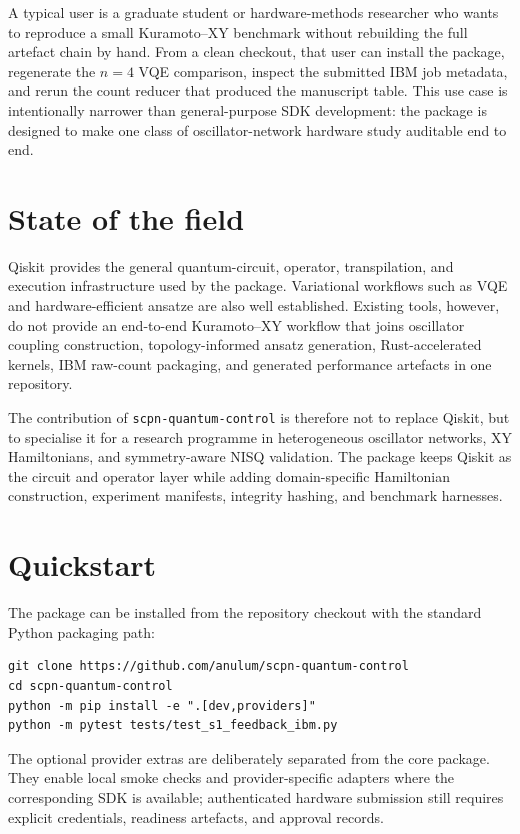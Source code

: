 \documentclass[11pt]{article}
\begin{document}
A typical user is a graduate student or hardware-methods researcher who wants
to reproduce a small Kuramoto--XY benchmark without rebuilding the full
artefact chain by hand. From a clean checkout, that user can install the
package, regenerate the $n=4$ VQE comparison, inspect the submitted IBM job
metadata, and rerun the count reducer that produced the manuscript table. This
use case is intentionally narrower than general-purpose SDK development: the
package is designed to make one class of oscillator-network hardware study
auditable end to end.

\section*{State of the field}

Qiskit provides the general quantum-circuit, operator, transpilation, and
execution infrastructure used by the package. Variational workflows such as VQE
and hardware-efficient ansatze are also well established. Existing tools,
however, do not provide an end-to-end Kuramoto--XY workflow that joins
oscillator coupling construction, topology-informed ansatz generation,
Rust-accelerated kernels, IBM raw-count packaging, and generated performance
artefacts in one repository.

The contribution of \texttt{scpn-quantum-control} is therefore not to replace
Qiskit, but to specialise it for a research programme in heterogeneous
oscillator networks, XY Hamiltonians, and symmetry-aware NISQ validation. The
package keeps Qiskit as the circuit and operator layer while adding
domain-specific Hamiltonian construction, experiment manifests, integrity
hashing, and benchmark harnesses.

\section*{Quickstart}

The package can be installed from the repository checkout with the standard
Python packaging path:

\begin{verbatim}
git clone https://github.com/anulum/scpn-quantum-control
cd scpn-quantum-control
python -m pip install -e ".[dev,providers]"
python -m pytest tests/test_s1_feedback_ibm.py
\end{verbatim}

The optional provider extras are deliberately separated from the core package.
They enable local smoke checks and provider-specific adapters where the
corresponding SDK is available; authenticated hardware submission still
requires explicit credentials, readiness artefacts, and approval records.
\end{document}
